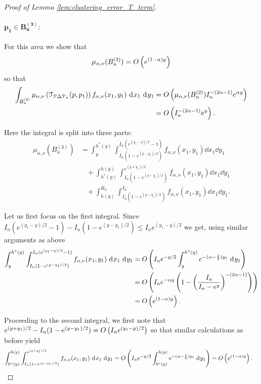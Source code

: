 \begin{proof}[Proof of Lemma \ref{lem:clustering_error_T_term}]
\paragraph{$\bm{p_1 \in B_n^{(3)}}:$}

For this area we show that 
\begin{equation}\label{eq:mu_triangle_diff_3}
	\mu_{\alpha, \nu}(B_n^{(3)}) = O\left(e^{(1-\alpha)y}\right)
\end{equation} 
so that
\begin{align*}
	\int_{B_n^{(3)}} \mu_{\alpha, \nu}\left(\mathcal{T}_{{\mathcal P} \Delta {\mathcal P}_n}(p,p_1)\right) 
		f_{\alpha,\nu}(x_1,y_1)	\operatorname{\, \mathrm{d}\hspace{-1pt}} x_1 \operatorname{\, \mathrm{d}\hspace{-1pt}} y_1
	&= O\left(\mu_{\alpha, \nu}(B_n^{(2)}) I_n^{-(2\alpha - 1)} e^{\alpha y}\right)\\
	&= O\left(I_n^{-(2\alpha-1)} e^{y}\right).
\end{align*}

Here the integral is split into three parts:
\begin{align*}
	\mu_{\alpha, \nu}(B_n^{(3)}) &= \int_y^{h^\ast(y)} \int_{I_n(1-e^{(y-y_1)/2})}^{I_n(e^{(y_1-y)/2}-1)}
		f_{\alpha,\nu}(x_1,y_1) \dd x_1 \dd y_1\\
	&\hspace{10pt}+ \int_{h^\ast(y)}^{h(y)} \int_{I_n(1-e^{(y-y_1)/2})}^{e^{(y+y_1)/2}}
		f_{\alpha,\nu}(x_1,y_1) \dd x_1 \dd y_1\\
	&\hspace{10pt}+ \int_{h(y)}^{R_n} \int_{I_n(1-e^{(y-y_1)/2})}^{I_n}
		f_{\alpha,\nu}(x_1,y_1) \dd x_1 \dd y_1.
\end{align*}

Let us first focus on the first integral. Since	$I_n(e^{(y_1-y)/2}-1) - I_n(1-e^{(y-y_1)/2}) \le I_n e^{(y_1-y)/2}$ we get,
using similar arguments as above
\begin{align*}
	\int_y^{h^\ast(y)} \int_{I_n(1-e^{(y-y_1)/2})}^{I_n(e^{(y_1-y)/2}-1)} f_{\alpha,\nu}(x_1,y_1) \operatorname{\, \mathrm{d}\hspace{-1pt}} x_1 \operatorname{\, \mathrm{d}\hspace{-1pt}} y_1
	&= O\left(I_n e^{-y/2} \int_y^{h^\ast(y)} e^{-(\alpha - \frac{1}{2})y_1} \operatorname{\, \mathrm{d}\hspace{-1pt}} y_1\right)\\
	&= O\left(I_n e^{-\alpha y} \left(1 - \left(\frac{I_n}{I_n - e^y}\right)^{-(2\alpha - 1)}\right)\right)\\
	&= O\left(e^{(1-\alpha)y}\right).
\end{align*}

Proceeding to the second integral, we first note that $e^{(y+y_1)/2} - I_n(1-e^{(y-y_1)/2}) = O\left(I_n e^{(y_1-y)/2}\right)$ so that similar calculations as before yield
\begin{align*}
	\int_{h^\ast(y)}^{h(y)} \int_{I_n(1-e^{(y-y_1)/2})}^{e^{(y+y_1)/2}}	f_{\alpha,\nu}(x_1,y_1) \operatorname{\, \mathrm{d}\hspace{-1pt}} x_1 \operatorname{\, \mathrm{d}\hspace{-1pt}} y_1
	&= O\left(I_n e^{-y/2} \int_{h^\ast(y)}^{h(y)} e^{-(\alpha - \frac{1}{2})y_1} \operatorname{\, \mathrm{d}\hspace{-1pt}} y_1\right)
		= O\left(e^{(1-\alpha)y}\right).
\end{align*}



\end{proof}